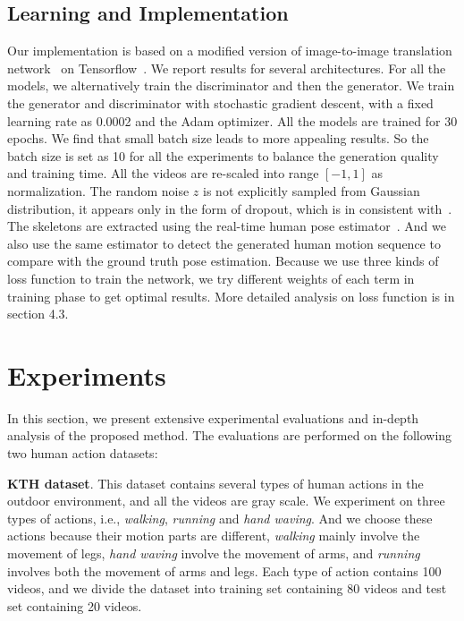 \documentclass[journal]{IEEEtran}
\begin{document}
\subsection{Learning and Implementation}
Our implementation is based on a modified version of image-to-image translation network~\cite{DBLP:journals/corr/IsolaZZE16} on Tensorflow~\cite{DBLP:journals/corr/AbadiABBCCCDDDG16}. We report results for several architectures. For all the models, we alternatively train the discriminator and then the generator. We train the generator and discriminator with stochastic gradient descent, with a fixed learning rate as 0.0002 and the Adam optimizer. All the models are trained for 30 epochs. We find that small batch size leads to more appealing results. So the batch size is set as 10 for all the experiments to balance the generation quality and training time. All the videos are re-scaled into range $[-1,1]$ as normalization. The random noise $z$ is not explicitly sampled from Gaussian distribution, it appears only in the form of dropout, which is in consistent with~\cite{DBLP:journals/corr/IsolaZZE16}. The skeletons are extracted using the real-time human pose estimator~\cite{cao2016realtime}. And we also use the same estimator to detect the generated human motion sequence to compare with the ground truth pose estimation. Because we use three kinds of loss function to train the network, we try different weights of each term in training phase to get optimal results. More detailed analysis on loss function is in section 4.3.

\section{Experiments}
In this section, we present extensive experimental evaluations and in-depth analysis of the proposed method. The evaluations are performed on the following two human action datasets:

\textbf{KTH dataset}. This dataset contains several types of human actions in the outdoor environment, and all the videos are gray scale. We experiment on three types of actions, i.e., \textit{walking}, \textit{running} and \textit{hand waving}. And we choose these actions because their motion parts are different, \textit{walking} mainly involve the movement of legs, \textit{hand waving} involve the movement of arms, and \textit{running} involves both the movement of arms and legs. Each type of action contains 100 videos, and we divide the dataset into training set containing 80 videos and test set containing 20 videos.
\end{document}
